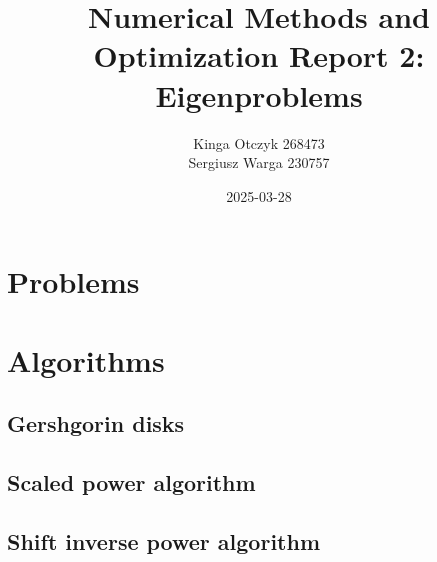 \documentclass[a4paper]{article}
\title{Numerical Methods and Optimization Report 2:
  Eigenproblems}
\author{Kinga Otczyk 268473\\Sergiusz Warga 230757}
\date{2025-03-28}
\begin{document}
\maketitle
\tableofcontents
\pagebreak

\section{Problems}





\clearpage

\section{Algorithms}
\subsection{Gershgorin disks}%
\label{algorithm:gershgorin}

\subsection{Scaled power algorithm}

\subsection{Shift inverse power algorithm}



\clearpage

\nocite{Meyer, GoluVanl96, Zdunek}


\end{document}

